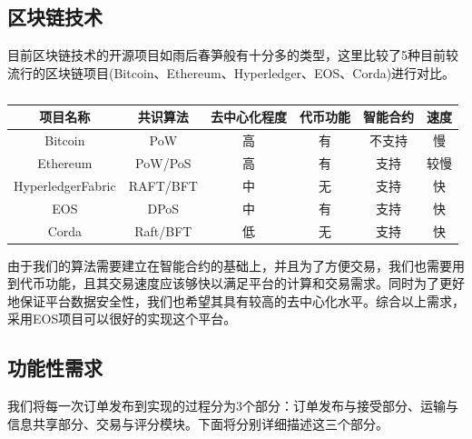 \documentclass[UTF8]{ctexart}
\begin{document}
\begin{multicols}{2}
  \subsection{区块链技术}
  目前区块链技术的开源项目如雨后春笋般有十分多的类型，这里比较了5种目前较流行的区块链项目(Bitcoin、Ethereum、Hyperledger、EOS、Corda)进行对比。\\
  \renewcommand{\tablename}{\small\heiti表\songti}
  \begin{table}[htbp]
    \centering
    \caption{\small{}\songti}
    \begin{tabular}{|c|c|c|c|c|c|}
      \hline
      项目名称 & 共识算法   & 去中心化程度 & 代币功能  & 智能合约 &速度 \\ \hline
      Bitcoin & PoW       & 高         & 有 & 不支持 & 慢\\ \hline
      Ethereum & PoW/PoS & 高 & 有 &支持 &较慢\\ \hline
      HyperledgerFabric & RAFT/BFT & 中 & 无 &支持 & 快\\ \hline
      EOS & DPoS & 中 & 有 &支持 &快\\ \hline
      Corda & Raft/BFT & 低 & 无 &支持 &快\\ \hline
    \end{tabular}
  \end{table}
  \indent 由于我们的算法需要建立在智能合约的基础上，并且为了方便交易，我们也需要用到代币功能，且其交易速度应该够快以满足平台的计算和交易需求。同时为了更好地保证平台数据安全性，我们也希望其具有较高的去中心化水平。综合以上需求，采用EOS项目可以很好的实现这个平台。
  \subsection{功能性需求}
  我们将每一次订单发布到实现的过程分为3个部分：订单发布与接受部分、运输与信息共享部分、交易与评分模块。下面将分别详细描述这三个部分。

\end{multicols}
\end{document}
